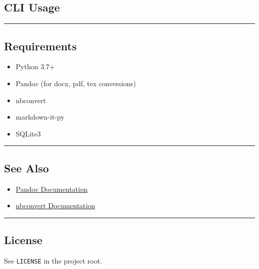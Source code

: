\subsection{CLI Usage}\label{cli-usage}

\begin{Shaded}
\begin{Highlighting}[]
 \OperatorTok{\textless{}}\OperatorTok{\textgreater{}}\OperatorTok{\textless{}}\OperatorTok{\textgreater{}}\OperatorTok{\textless{}}\OperatorTok{\textgreater{}}\NormalTok{ [{-}{-}record\_id }\OperatorTok{\textless{}}\OperatorTok{\textgreater{}}\NormalTok{]}
\end{Highlighting}
\end{Shaded}

\begin{center}\rule{0.5\linewidth}{0.5pt}\end{center}

\subsection{Requirements}\label{requirements}

\begin{itemize}
\tightlist
\item
  Python 3.7+
\item
  Pandoc (for docx, pdf, tex conversions)
\item
  nbconvert
\item
  markdown-it-py
\item
  SQLite3
\end{itemize}

\begin{center}\rule{0.5\linewidth}{0.5pt}\end{center}

\subsection{See Also}\label{see-also}

\begin{itemize}
\tightlist
\item
  \href{https://pandoc.org/}{Pandoc Documentation}
\item
  \href{https://nbconvert.readthedocs.io/en/latest/}{nbconvert
  Documentation}
\end{itemize}

\begin{center}\rule{0.5\linewidth}{0.5pt}\end{center}

\subsection{License}\label{license}

See \texttt{LICENSE} in the project root.
